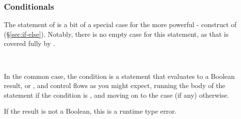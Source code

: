 \subsubsection{Conditionals}

The  statement of \Prose{} is a bit of a special case for the more
powerful - construct of \Poetry{} (\S\ref{sec:if-else}). Notably,
there is no empty  case for this  statement, as that is covered
fully by \Poetry{}.

\begin{bnf*}
     \\
\end{bnf*}

In the common case, the condition is a statement that evaluates to a Boolean
result,  or , and control flows as you might expect, running
the body of the  statement if the condition is , and moving on
to the  case (if any) otherwise.

If the result is not a Boolean, this is a runtime type error.

\begin{prooftree}
\end{prooftree}
\begin{prooftree}
\end{prooftree}
\begin{prooftree}
\end{prooftree}
\begin{prooftree}
\end{prooftree}

